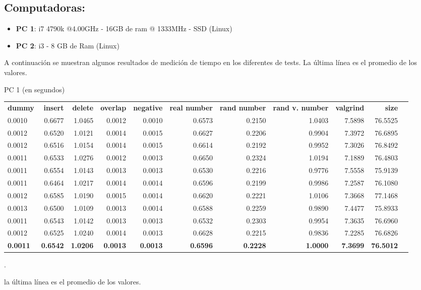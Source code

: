 \documentclass[a4paper, 12pt]{article}
\begin{document}
\subsection{Computadoras:}
\begin{itemize}
\item \textbf{PC 1}: i7 4790k @4.00GHz - 16GB de ram @ 1333MHz - SSD (Linux)
\item \textbf{PC 2}: i3 - 8 GB de Ram  (Linux)
\end{itemize}

\newpage
A continuación se muestran algunos resultados de medición de tiempo en los diferentes de tests. La última línea es el promedio de los valores.
\begin{adjustwidth}{-2.5 cm}{-2.5 cm}\centering\begin{threeparttable}[!htb]
\caption{PC 1 (en segundos)}\label{tab: }
\scriptsize
\begin{tabular}{lrrrrrrrrrr}\toprule
\textbf{dummy} &\textbf{insert} &\textbf{delete} &\textbf{overlap} &\textbf{negative} &\textbf{real number} &\textbf{rand number} &\textbf{rand v. number} &\textbf{valgrind} &\textbf{size} \\\cmidrule{1-10}
0.0010 &0.6677 &1.0465 &0.0012 &0.0010 &0.6573 &0.2150 &1.0403 &7.5898 &76.5525 \\\cmidrule{1-10}
0.0012 &0.6520 &1.0121 &0.0014 &0.0015 &0.6627 &0.2206 &0.9904 &7.3972 &76.6895 \\\cmidrule{1-10}
0.0012 &0.6516 &1.0154 &0.0014 &0.0015 &0.6614 &0.2192 &0.9952 &7.3026 &76.8492 \\\cmidrule{1-10}
0.0011 &0.6533 &1.0276 &0.0012 &0.0013 &0.6650 &0.2324 &1.0194 &7.1889 &76.4803 \\\cmidrule{1-10}
0.0011 &0.6554 &1.0143 &0.0013 &0.0013 &0.6530 &0.2216 &0.9776 &7.5558 &75.9139 \\\cmidrule{1-10}
0.0011 &0.6464 &1.0217 &0.0014 &0.0014 &0.6596 &0.2199 &0.9986 &7.2587 &76.1080 \\\cmidrule{1-10}
0.0012 &0.6585 &1.0190 &0.0015 &0.0014 &0.6620 &0.2221 &1.0106 &7.3668 &77.1468 \\\cmidrule{1-10}
0.0013 &0.6500 &1.0109 &0.0013 &0.0014 &0.6588 &0.2259 &0.9890 &7.4477 &75.8933 \\\cmidrule{1-10}
0.0011 &0.6543 &1.0142 &0.0013 &0.0013 &0.6532 &0.2303 &0.9954 &7.3635 &76.6960 \\\midrule
0.0012 &0.6525 &1.0240 &0.0014 &0.0013 &0.6628 &0.2215 &0.9836 &7.2285 &76.6826 \\
\textbf{0.0011} &\textbf{0.6542} &\textbf{1.0206} &\textbf{0.0013} &\textbf{0.0013} &\textbf{0.6596} &\textbf{0.2228} &\textbf{1.0000} &\textbf{7.3699} &\textbf{76.5012} \\
\bottomrule
\end{tabular}
.\end{threeparttable}\end{adjustwidth}
\footnotesize *la última línea es el promedio de los valores.
\end{document}
